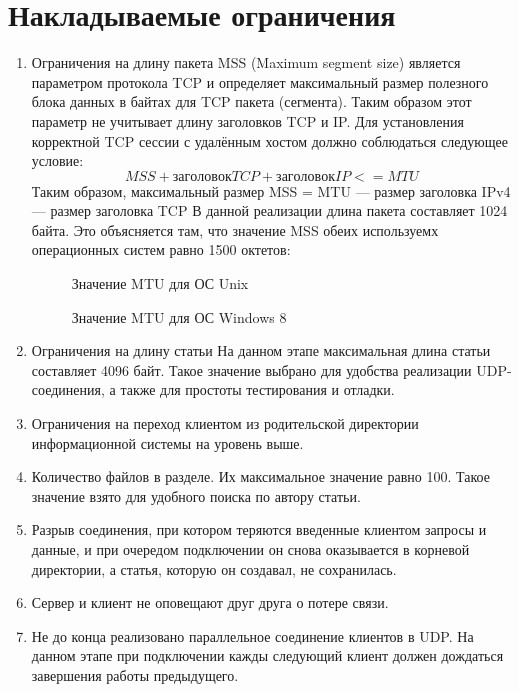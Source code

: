 \documentclass[12pt,a4paper]{report}
\begin{document}
\section{Накладываемые ограничения}
\begin{enumerate}
\item Ограничения на длину пакета
MSS (Maximum segment size) является параметром протокола TCP и определяет максимальный размер полезного блока данных в байтах для TCP пакета (сегмента). Таким образом этот параметр не учитывает длину заголовков TCP и IP. Для установления корректной TCP сессии с удалённым хостом должно соблюдаться следующее условие:
\begin{equation}
	MSS + заголовок TCP + заголовок IP <= MTU
\end{equation}
Таким образом, максимальный размер MSS = MTU — размер заголовка IPv4 — размер заголовка TCP
В данной реализации длина пакета составляет 1024 байта. Это объясняется там, что значение MSS обеих используемх операционных систем равно 1500 октетов:
\begin{figure}[h]
\caption{Значение MTU для ОС Unix}
\label{fig:mtu_unix}
\end{figure}
\begin{figure}[h]
\caption{Значение MTU для ОС Windows 8}
\label{fig:mtu_win}
\end{figure}
\item Ограничения на длину статьи
На данном этапе максимальная длина статьи составляет 4096 байт. Такое значение выбрано для удобства реализации UDP-соединения, а также для простоты тестирования и отладки.
\item Ограничения на переход клиентом из родительской директории информационной системы на уровень выше.
\item Количество файлов в разделе. Их максимальное значение равно 100. Такое значение взято для удобного поиска по автору статьи.
\item Разрыв соединения, при котором теряются введенные клиентом запросы и данные, и при очередом подключении он снова оказывается в корневой директории, а статья, которую он создавал, не сохранилась.
\item Сервер и клиент не оповещают друг друга о потере связи.
\item Не до конца реализовано параллельное соединение клиентов в UDP. На данном этапе при подключении кажды следующий клиент должен дождаться завершения работы предыдущего.
\end{enumerate}
\end{document}
